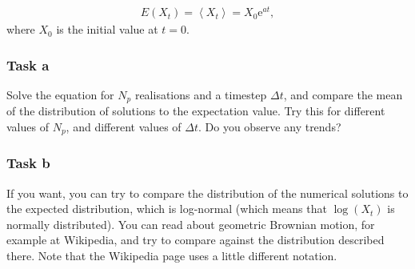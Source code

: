 \documentclass[a4paper]{article}
\begin{document}
\begin{align}
    \label{eq:}
     E(X_t) = \left\langle X_t \right\rangle = X_0  \mathrm{e}^{at},
\end{align}
where $X_0$ is the initial value at $t=0$.


\subsubsection*{Task a}

Solve the equation for $N_p$ realisations and a timestep $\Delta t$, and compare the mean of the distribution of solutions to the expectation value. Try this for different values of $N_p$, and different values of $\Delta t$. Do you observe any trends?

\subsubsection*{Task b}

If you want, you can try to compare the distribution of the numerical solutions to the expected distribution, which is log-normal (which means that $\log(X_t)$ is normally distributed). You can read about geometric Brownian motion, for example at Wikipedia, and try to compare against the distribution described there. Note that the Wikipedia page uses a little different notation.
\end{document}
